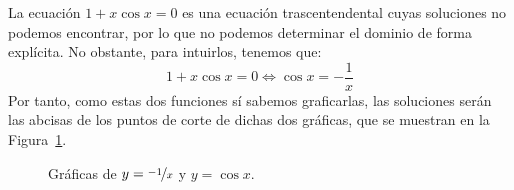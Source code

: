 \documentclass[12pt]{article}
\begin{document}
\begin{ejercicio}
\begin{enumerate}
            La ecuación $1+x\cos x=0$ es una ecuación trascentendental cuyas soluciones no podemos encontrar, por lo que no podemos determinar el dominio de forma explícita. No obstante, para intuirlos, tenemos que:
            \begin{equation*}
                1+x\cos x=0\Longleftrightarrow \cos x=-\dfrac{1}{x}
            \end{equation*}
            Por tanto, como estas dos funciones sí sabemos graficarlas, las soluciones serán las abcisas de los puntos de corte de dichas dos gráficas, que se muestran en la Figura~\ref{fig:graficas}.
            \begin{figure}[H]
                \centering
                \caption{Gráficas de $y=\nicefrac{-1}{x}$ y $y=\cos x$.}
                \label{fig:graficas}
            \end{figure}
            \begin{comment}

            Definimos la función auxiliar:
            \Func{f}{\bb{R}}{\bb{R}}{x}{1+x\cos x}

            Tenemos que $f$ es continua. Veamos que, para cada $k\in \bb{Z}\setminus \{1\}$, $\exists! x_k\inI_k$, donde $I_k$ es el intervalo abierto de extremos $\pi\cdot k$ y $\pi\cdot(k+1),$ tal que $f(x_k)=0$. Distinguimos en función de $k$:
            \begin{itemize}
                \item Si $k$ es par:
                \begin{align*}
                    f(\pi k) &= 1+\pi k\cos(\pi k) = 1+\pi k\cos 0 = 1+\pi k\\
                    f(\pi(k+1)) &= 1+\pi(k+1)\cos(\pi(k+1)) = 1+\pi(k+1)\cos \pi = 1-\pi(k+1)
                \end{align*}


\end{comment}
\end{enumerate}
\end{ejercicio}
\end{document}
